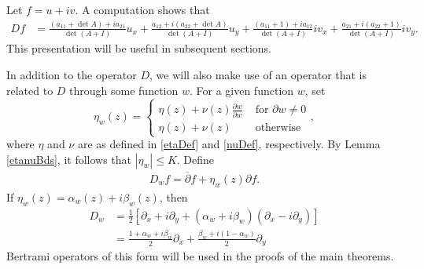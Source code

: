 \documentclass[12pt,reqno]{amsart}
\theoremstyle{plain}
\theoremstyle{definition}
\newcommand{\disp}{\displaystyle}
\newcommand{\al}{\alpha}
\newcommand{\be}{\beta}
\newcommand{\ol}{\overline}
\newcommand{\del}{ \partial}
\newcommand{\abs}[1]{\left\vert#1\right\vert}
\newcommand{\brac}[1]{\left[#1\right]}
\newcommand{\pr}[1]{\left( #1 \right) }
\begin{document}
Let $f = u + iv$.
A computation shows that
\begin{align*}
Df 
&=  \frac{ \pr{a_{11} + \det A} + i {a_{21}} }{\det\pr{A + I}}u_x 
+ \frac{ {a_{12}} + i \pr{a_{22} + \det A}}{ \det\pr{A + I}} u_y 
+ \frac{\pr{a_{11} + 1} + i {a_{12}}}{\det\pr{A + I}} i v_x
+ \frac{ {a_{21}} + i\pr{a_{22}  + 1} }{ \det\pr{A + I}} i v_y.
\end{align*}
This presentation will be useful in subsequent sections.

In addition to the operator $D$, we will also make use of an operator that is related to $D$ through some function $w$.
For a given function $w$, set
$$\eta_w\pr{z} = \left\{\begin{array}{ll} 
\eta\pr{z} + \nu\pr{z} \frac{\ol{\del w}}{\del w} & \text{ for } \del w \ne 0  \\  
\eta\pr{z} + \nu\pr{z} & \text{ otherwise }
\end{array} \right.,$$
where $\eta$ and $\nu$ are as defined in \eqref{etaDef} and \eqref{nuDef}, respectively.
By Lemma \ref{etanuBds}, it follows that $\disp \abs{\eta_w} \le K$.
Define
\begin{align}
D_w f = \ol{\del} f + \eta_w\pr{z} \del f.
\label{DwDef}
\end{align}
If $\eta_w\pr{z} = \al_w\pr{z} + i \be_w\pr{z}$, then
\begin{align}
D_w &= \frac{1}{2} \brac{\del_x + i \del_y + \pr{\al_w + i \be_w} \pr{\del_x - i \del_y } }
\nonumber \\
&= \frac{1 + \al_w + i \be_w}{2} \del_x + \frac{\be_w + i\pr{1 - \al_w}}{2} \del_y
\end{align}
Bertrami operators of this form will be used in the proofs of the main theorems.
\end{document}
